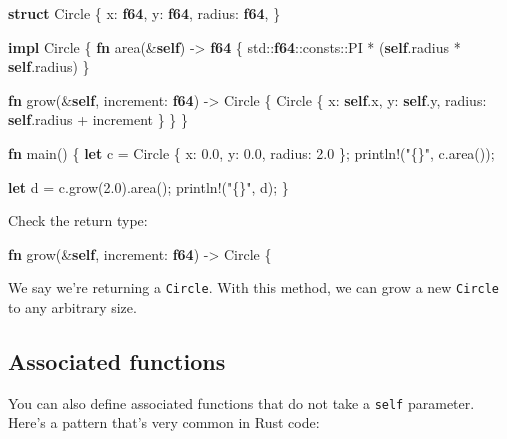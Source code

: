 \documentclass[a4paper,]{book}
\newenvironment{Shaded}{\begin{snugshade}}{\end{snugshade}}
\newcommand{\KeywordTok}[1]{\textcolor[rgb]{0.13,0.29,0.53}{\textbf{{#1}}}}
\newcommand{\DecValTok}[1]{\textcolor[rgb]{0.00,0.00,0.81}{{#1}}}
\newcommand{\StringTok}[1]{\textcolor[rgb]{0.31,0.60,0.02}{{#1}}}
\newcommand{\OtherTok}[1]{\textcolor[rgb]{0.56,0.35,0.01}{{#1}}}
\newcommand{\NormalTok}[1]{{#1}}
\begin{document}
\begin{Shaded}
\begin{Highlighting}[]
\KeywordTok{struct} \NormalTok{Circle \{}
    \NormalTok{x: }\KeywordTok{f64}\NormalTok{,}
    \NormalTok{y: }\KeywordTok{f64}\NormalTok{,}
    \NormalTok{radius: }\KeywordTok{f64}\NormalTok{,}
\NormalTok{\}}

\KeywordTok{impl} \NormalTok{Circle \{}
    \KeywordTok{fn} \NormalTok{area(&}\KeywordTok{self}\NormalTok{) -> }\KeywordTok{f64} \NormalTok{\{}
        \NormalTok{std::}\KeywordTok{f64}\NormalTok{::consts::PI * (}\KeywordTok{self}\NormalTok{.radius * }\KeywordTok{self}\NormalTok{.radius)}
    \NormalTok{\}}

    \KeywordTok{fn} \NormalTok{grow(&}\KeywordTok{self}\NormalTok{, increment: }\KeywordTok{f64}\NormalTok{) -> Circle \{}
        \NormalTok{Circle \{ x: }\KeywordTok{self}\NormalTok{.x, y: }\KeywordTok{self}\NormalTok{.y, radius: }\KeywordTok{self}\NormalTok{.radius + increment \}}
    \NormalTok{\}}
\NormalTok{\}}

\KeywordTok{fn} \NormalTok{main() \{}
    \KeywordTok{let} \NormalTok{c = Circle \{ x: }\DecValTok{0.0}\NormalTok{, y: }\DecValTok{0.0}\NormalTok{, radius: }\DecValTok{2.0} \NormalTok{\};}
    \OtherTok{println!}\NormalTok{(}\StringTok{"\{\}"}\NormalTok{, c.area());}

    \KeywordTok{let} \NormalTok{d = c.grow(}\DecValTok{2.0}\NormalTok{).area();}
    \OtherTok{println!}\NormalTok{(}\StringTok{"\{\}"}\NormalTok{, d);}
\NormalTok{\}}
\end{Highlighting}
\end{Shaded}

Check the return type:

\begin{Shaded}
\begin{Highlighting}[]
\KeywordTok{fn} \NormalTok{grow(&}\KeywordTok{self}\NormalTok{, increment: }\KeywordTok{f64}\NormalTok{) -> Circle \{}
\end{Highlighting}
\end{Shaded}

We say we're returning a \texttt{Circle}. With this method, we can grow
a new \texttt{Circle} to any arbitrary size.

\subsection{Associated functions}\label{associated-functions}

You can also define associated functions that do not take a
\texttt{self} parameter. Here's a pattern that's very common in Rust
code:
\end{document}
